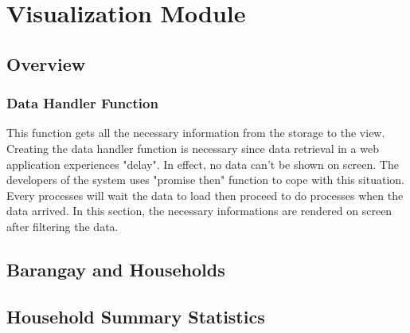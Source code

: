 \section{Visualization Module}
\subsection{Overview}
\subsubsection{Data Handler Function}
This function gets all the necessary information from the storage to the view. Creating the data handler function is necessary since data retrieval in a web application experiences "delay". In effect, no data can't be shown on screen. The developers of the system uses "promise then" function to cope with this situation. Every processes will wait the data to load then proceed to do processes when the data arrived. In this section, the necessary informations are rendered on screen after filtering the data.
\subsection{Barangay and Households}
\subsection{Household Summary Statistics}